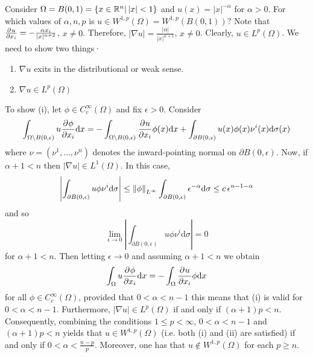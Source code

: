 \documentclass[11pt]{article}
\begin{document}
		\begin{eg}
			Consider $\Omega=B(0,1)=\{x\in\R^n|\,|x|<1\}$ and $u(x)=|x|^{-\alpha}$ for $\alpha>0$. For which values of $\alpha,n,p$ is $u\in W^{1,p}(\Omega)=W^{1,p}(B(0,1))$? Note that $\del{u}{x_i}=-\frac{\alpha x_i}{|x|^{\alpha+2}}$, $x\neq0$. Therefore, $|\nabla u|=\frac{|\alpha|}{|x|^{\alpha+1}}$, $x\neq0$. Clearly, $u\in L^p(\Omega)$. We need to show two things·
			\begin{enumerate}
			    \item $\nabla u$ exits in the distributional or weak sense.
			    \item $\nabla u\in L^p(\Omega)$
			\end{enumerate}
			To show (i), let $\phi\in C^\infty_c(\Omega)$ and fix $\epsilon>0$. Consider
			\begin{equation*}
				\int_{\Omega\backslash B(0,\epsilon)}u\del{\phi}{x_i}\mathrm{d}x=-\int_{\Omega\backslash B(0,\epsilon)}\del[]{u}{x_i}\phi(x) \mathrm{d}x+\int_{\partial B(0,\epsilon)}u(x)\phi(x)\nu^i(x)\mathrm{d}\sigma(x)
			\end{equation*}
			where $\nu=(\nu^1,\dots,\nu^n)$ denotes the inward-pointing normal on $\partial B(0,\epsilon)$. Now, if $\alpha+1<n$ then $|\nabla u|\in L^1(\Omega)$. In this case,
			\begin{equation*}
				\left|\int_{\partial B(0,\epsilon)}u\phi\nu^i\mathrm{d}\sigma\right|\le\norm{\phi}_{L^\infty}\int_{\partial B(0,\epsilon)}\epsilon^{-\alpha}\mathrm{d}\sigma\le c\,\epsilon^{n-1-\alpha}
			\end{equation*}
			and so
			\begin{equation*}
				\lim_{\epsilon\to0}\left|\int_{\partial B(0,\epsilon)}u\phi\nu^i\mathrm{d}\sigma\right|=0
			\end{equation*}
			for $\alpha+1<n$. Then letting $\epsilon\to0$ and assuming $\alpha+1<n$ we obtain
			\begin{equation*}
				\int_{\Omega}u\del[]{\phi}{x_i}\mathrm{d}x=-\int_{\Omega}\del[]{u}{x_i}\phi \mathrm{d}x
			\end{equation*}
			for all $\phi\in C^\infty_c(\Omega)$, provided that $0<\alpha<n-1$ this means that (i) is valid for $0<\alpha<n-1$. Furthermore, $|\nabla u|\in L^p(\Omega)$ if and only if $(\alpha+1)p<n$. Consequently, combining the conditions $1\leq p<\infty$, $0<\alpha<n-1$ and $(\alpha+1)p<n$ yields that $u\in W^{1,p}(\Omega)$ (i.e. both (i) and (ii) are satisfied) if and only if $0< \alpha<\frac{n-p}{p}$. Moreover, one has that $u\notin W^{1,p}(\Omega)$ for each $p\ge n$.
		\end{eg}
\end{document}
